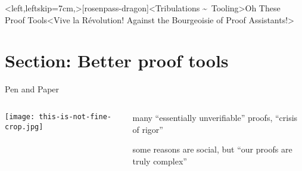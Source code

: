 \interlude*<left,leftskip=7cm,>[rosenpass-dragon]<Tribulations \textasciitilde\ Tooling>{Oh These\\Proof Tools}<Vive la Révolution! Against the Bourgeoisie of Proof Assistants!>
\section{Section: Better proof tools}

\begin{frame}[T]{Pen and Paper}
  \begin{columns}[fullwidth,t]
    \begin{column}{.29\linewidth}
      \par\nointerlineskip
      \texttt{[image: this-is-not-fine-crop.jpg]}%
    \end{column}
    \hfill
    \begin{column}{.68\linewidth}
      \small

\begin{description}[]
\item[{Bellare and Rogaway: [BR06]}]\leavevmode\newline many \enquote{essentially unverifiable} proofs, \enquote{crisis of rigor}

\item[{Halevi: [Hal05]}]\leavevmode\newline
	some reasons are social,
but \enquote{our proofs are truly complex}



\end{description}
    \end{column}
  \end{columns}
\end{frame}

